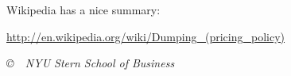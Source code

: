 \documentclass[12pt]{exam}
\begin{document}
\begin{questions}
\begin{solution}
%
Wikipedia has a nice summary:  \\
\centerline{\url{http://en.wikipedia.org/wiki/Dumping_(pricing_policy)}}
\end{solution}


\end{questions}

\vfill \centerline{\it \copyright \ \number\year \
NYU Stern School of Business}
\end{document}
